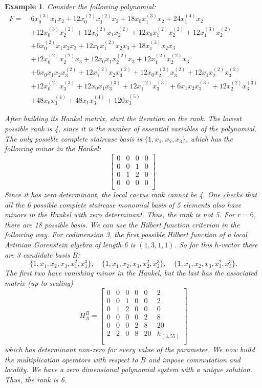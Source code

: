 \documentclass[a4paper,11p]{amsart}
\newtheorem{example0}[defn0]{Example}
\newenvironment{example}{ \begin{example0}\rm}{\end{example0}}
\begin{document}
\begin{example}\label{Example:LocalCactus}
Consider the following polynomial:    
{\small{
\[
\begin{aligned}
F =\;& 6x_0^{(3)}x_1x_2 + 12x_0^{(2)}x_1^{(2)}x_2 + 18x_0x_1^{(3)}x_2 + 24x_1^{(4)}x_2 \\
&+ 12x_0^{(3)}x_2^{(2)} + 12x_0^{(2)}x_1x_2^{(2)} + 12x_0x_1^{(2)}x_2^{(2)} + 12x_1^{(3)}x_2^{(2)} \\
&+ 6x_0^{(2)}x_1x_2x_3 + 12x_0x_1^{(2)}x_2x_3 + 18x_1^{(3)}x_2x_3 \\
&+ 12x_0^{(2)}x_2^{(2)}x_3 + 12x_0x_1x_2^{(2)}x_3 + 12x_1^{(2)}x_2^{(2)}x_3 \\
&+ 6x_0x_1x_2x_3^{(2)} + 12x_1^{(2)}x_2x_3^{(2)} + 12x_0x_2^{(2)}x_3^{(2)} + 12x_1x_2^{(2)}x_3^{(2)} \\
&+ 12x_0^{(2)}x_3^{(3)} + 12x_0x_1x_3^{(3)} + 12x_1^{(2)}x_3^{(3)} + 6x_1x_2x_3^{(3)} + 12x_2^{(2)}x_3^{(3)} \\
&+ 48x_0x_3^{(4)} + 48x_1x_3^{(4)} + 120x_3^{(5)}
\end{aligned}
\]
}}

After building its Hankel matrix, start the iteration on the rank. The lowest possible rank is 4, since it is the number of essential variables of the polynomial. The only possible complete staircase basis is $\{1,x_1,x_2,x_3\}$, which has the following minor in the Hankel:
\[
\begin{bmatrix}
0 & 0 & 0 & 0 \\
0 & 0 & 1 & 0 \\
0 & 1 & 2 & 0 \\
0 & 0 & 0 & 0 \\
\end{bmatrix}.
\]
Since it has zero determinant, the local cactus rank cannot be 4. One checks that all the 6 possible complete staircase monomial basis of 5 elements also have minors in the Hankel with zero determinant. Thus, the rank is not 5. For $r=6$, there are 18 possible basis. We can use the Hilbert function criterion in the following way. For codimension 3, the first possible Hilbert function of a local Artinian Gorenstein algebra of length 6 is $(1,3,1,1)$. So for this $h$-vector there are 3 candidate basis $B$:
\[\{1,x_1,x_2,x_3,x_1^2,x_1^3\}, \quad \{1,x_1,x_2,x_3,x_2^2,x_2^3\}, \quad \{1,x_1,x_2,x_3,x_3^2,x_3^3\}.\]
The first two have vanishing minor in the Hankel, but the last has the associated matrix (up to scaling)
\[H_{\Lambda}^B=
\begin{bmatrix}
0 & 0 & 0 & 0 & 0 & 2 \\
0 & 0 & 1 & 0 & 0 & 2 \\
0 & 1 & 2 & 0 & 0 & 0 \\
0 & 0 & 0 & 0 & 2 & 8 \\
0 & 0 & 0 & 2 & 8 & 20 \\
2 & 2 & 0 & 8 & 20 & h_{(3,55)} \\
\end{bmatrix}
\]
which has determinant non-zero for every value of the parameter. We now build the multiplication operators with respect to $B$ and impose commutation and locality. We have a zero dimensional polynomial system with a unique solution. Thus, the rank is 6.  
\end{example}
\end{document}

